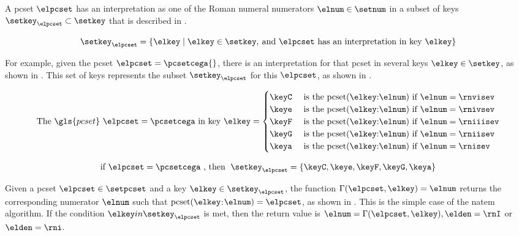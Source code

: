 
A \gls{pcset} $\elpcset$ has an interpretation as one of the
Roman numeral numerators $\elnum \in \setnum$ in a subset of
keys $\setkey_{\elpcset} \subset \setkey$ that is described
in .

\begin{equation}
    \label{eq:keys_for_pcset}
    \setkey_{\elpcset} = \{\elkey \mid \elkey \in \setkey,
     \: \text{and $\elpcset$ has an interpretation in key $\elkey$}\}
\end{equation}

For example, given the \gls{pcset} $\elpcset =
\pcsetcega{}$, there is an interpretation for that
\gls{pcset} in several keys $\elkey \in \setkey$, as shown
in . This set of keys represents the
subset $\setkey_\elpcset$ for this $\elpcset$, as shown in
. 

\begin{equation}
    \label{eq:pcset_cega}
    \text{The } \gls{pcset} \text{ } \elpcset = \pcsetcega \text{ in key } \elkey =
    \begin{cases}
        \keyC & \text{ is the pcset}(\elkey\text{:}\elnum)\text{ if } \elnum = \rnvisev \\
        \keye & \text{ is the pcset}(\elkey\text{:}\elnum)\text{ if } \elnum = \rnivsev \\
        \keyF & \text{ is the pcset}(\elkey\text{:}\elnum)\text{ if } \elnum = \rniiisev \\
        \keyG & \text{ is the pcset}(\elkey\text{:}\elnum)\text{ if } \elnum = \rniisev \\
        \keya & \text{ is the pcset}(\elkey\text{:}\elnum)\text{ if } \elnum = \rnisev \\
    \end{cases}
\end{equation}

\begin{equation}
    \label{eq:keys_for_pcset_example}
    \text{if } \elpcset = \pcsetcega \text{ , then } \; 
    \setkey_{\elpcset} = \{ \keyC, \keye, \keyF, \keyG, \keya \}
\end{equation}

Given a \gls{pcset} $\elpcset \in \setpcset$ and a key
$\elkey \in \setkey_\elpcset$, the function
$\Gamma(\elpcset, \elkey) = \elnum$ returns the
corresponding numerator $\elnum$ such that
$\text{pcset}(\elkey$:$\elnum) = \elpcset$, as shown in
. This is the simple case of
the \gls{natem} algorithm. If the condition $\elkey in
\setkey_\elpcset$ is met, then the return value is $\elnum =
\Gamma(\elpcset, \elkey), \elden = \rnI$ or $\elden = \rni$.

